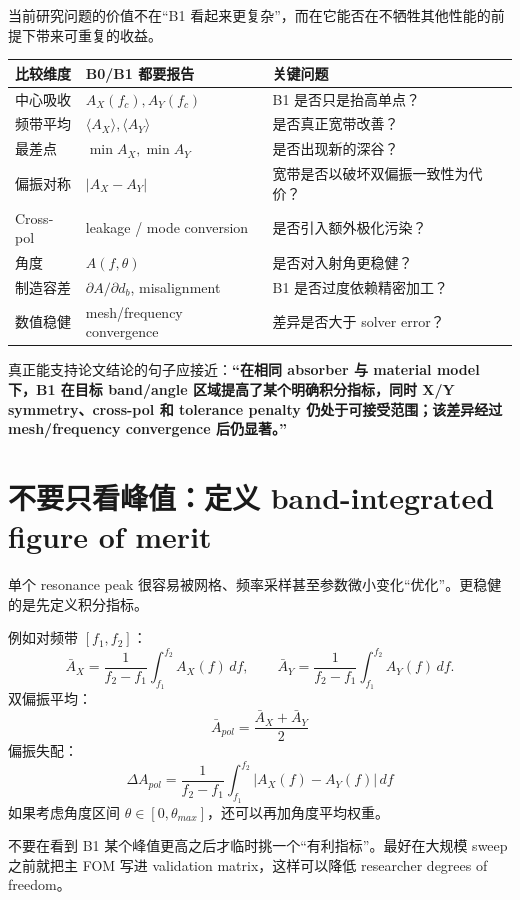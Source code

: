 \documentclass[11pt,a4paper,openany]{ctexrep}
\begin{document}
当前研究问题的价值不在“B1 看起来更复杂”，而在它能否在不牺牲其他性能的前提下带来可重复的收益。

\begin{center}
\noindent\begin{tabularx}{\textwidth}{p{3.3cm}X X}
\toprule
比较维度 & B0/B1 都要报告 & 关键问题 \\
\midrule
中心吸收 & $A_X(f_c),A_Y(f_c)$ & B1 是否只是抬高单点？ \\
频带平均 & $\langle A_X\rangle,\langle A_Y\rangle$ & 是否真正宽带改善？ \\
最差点 & $\min A_X,\min A_Y$ & 是否出现新的深谷？ \\
偏振对称 & $|A_X-A_Y|$ & 宽带是否以破坏双偏振一致性为代价？ \\
Cross-pol & leakage / mode conversion & 是否引入额外极化污染？ \\
角度 & $A(f,\theta)$ & 是否对入射角更稳健？ \\
制造容差 & $\partial A/\partial d_b$, misalignment & B1 是否过度依赖精密加工？ \\
数值稳健 & mesh/frequency convergence & 差异是否大于 solver error？ \\
\bottomrule
\end{tabularx}
\end{center}

\begin{projectbox}
真正能支持论文结论的句子应接近：\textbf{“在相同 absorber 与 material model 下，B1 在目标 band/angle 区域提高了某个明确积分指标，同时 X/Y symmetry、cross-pol 和 tolerance penalty 仍处于可接受范围；该差异经过 mesh/frequency convergence 后仍显著。”}
\end{projectbox}

\section{不要只看峰值：定义 band-integrated figure of merit}

单个 resonance peak 很容易被网格、频率采样甚至参数微小变化“优化”。更稳健的是先定义积分指标。

例如对频带 $[f_1,f_2]$：
\[
\bar A_X=\frac{1}{f_2-f_1}\int_{f_1}^{f_2}A_X(f)\,df,
\qquad
\bar A_Y=\frac{1}{f_2-f_1}\int_{f_1}^{f_2}A_Y(f)\,df.
\]
双偏振平均：
\[
\boxed{
\bar A_{pol}=\frac{\bar A_X+\bar A_Y}{2}
}
\]
偏振失配：
\[
\boxed{
\Delta A_{pol}=\frac{1}{f_2-f_1}
\int_{f_1}^{f_2}|A_X(f)-A_Y(f)|\,df
}
\]
如果考虑角度区间 $\theta\in[0,\theta_{max}]$，还可以再加角度平均权重。

\begin{mistakebox}
不要在看到 B1 某个峰值更高之后才临时挑一个“有利指标”。最好在大规模 sweep 之前就把主 FOM 写进 validation matrix，这样可以降低 researcher degrees of freedom。
\end{mistakebox}
\end{document}

